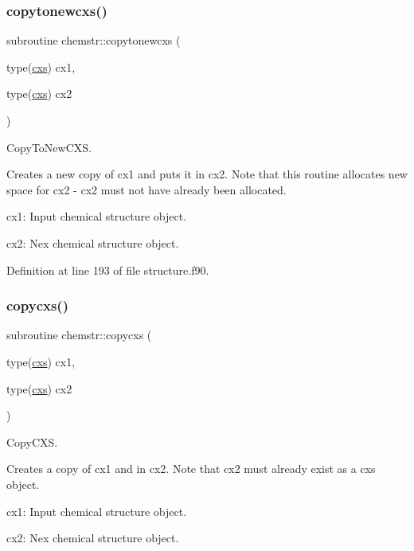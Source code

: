 \subsubsection{\texorpdfstring{copytonewcxs()}{copytonewcxs()}}
{\footnotesize\ttfamily subroutine chemstr\+::copytonewcxs (\begin{DoxyParamCaption}\item[{type(\mbox{\hyperlink{structchemstr_1_1cxs}{cxs}})}]{cx1,  }\item[{type(\mbox{\hyperlink{structchemstr_1_1cxs}{cxs}})}]{cx2 }\end{DoxyParamCaption})}



Copy\+To\+New\+C\+XS. 

Creates a new copy of cx1 and puts it in cx2. Note that this routine allocates new space for cx2 -\/ cx2 must not have already been allocated.


\begin{DoxyItemize}
\item cx1\+: Input chemical structure object.
\item cx2\+: Nex chemical structure object. 
\end{DoxyItemize}

Definition at line 193 of file structure.\+f90.

\mbox{\label{namespacechemstr_a037cd002260a81e4cb610374dd2b5b91}} 
\subsubsection{\texorpdfstring{copycxs()}{copycxs()}}
{\footnotesize\ttfamily subroutine chemstr\+::copycxs (\begin{DoxyParamCaption}\item[{type(\mbox{\hyperlink{structchemstr_1_1cxs}{cxs}})}]{cx1,  }\item[{type(\mbox{\hyperlink{structchemstr_1_1cxs}{cxs}})}]{cx2 }\end{DoxyParamCaption})}



Copy\+C\+XS. 

Creates a copy of cx1 and in cx2. Note that cx2 must already exist as a cxs object.


\begin{DoxyItemize}
\item cx1\+: Input chemical structure object.
\item cx2\+: Nex chemical structure object. 
\end{DoxyItemize}


